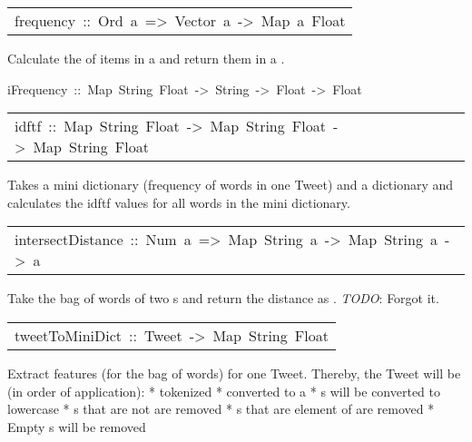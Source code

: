 \begin{haddockdesc}
\item[\begin{tabular}{@{}l}
frequency\ ::\ Ord\ a\ =>\ Vector\ a\ ->\ Map\ a\ Float
\end{tabular}]\haddockbegindoc
Calculate the  of items in a  and return them
 in a .\par

\end{haddockdesc}
\begin{haddockdesc}
\item[
iFrequency\ ::\ Map\ String\ Float\ ->\ String\ ->\ Float\ ->\ Float
]
\end{haddockdesc}
\begin{haddockdesc}
\item[\begin{tabular}{@{}l}
idftf\ ::\ Map\ String\ Float\ ->\ Map\ String\ Float\ ->\ Map\ String\ Float
\end{tabular}]\haddockbegindoc
Takes a mini dictionary (frequency of words in one Tweet) and a
 dictionary and calculates the idftf values for all words in the
 mini dictionary.\par

\end{haddockdesc}
\begin{haddockdesc}
\item[\begin{tabular}{@{}l}
intersectDistance\ ::\ Num\ a\ =>\ Map\ String\ a\ ->\ Map\ String\ a\ ->\ a
\end{tabular}]\haddockbegindoc
Take the bag of words of two s and return the distance as
 . \emph{TODO}: Forgot it.\par

\end{haddockdesc}
\begin{haddockdesc}
\item[\begin{tabular}{@{}l}
tweetToMiniDict\ ::\ Tweet\ ->\ Map\ String\ Float
\end{tabular}]\haddockbegindoc
Extract features (for the bag of words) for one Tweet.
 Thereby, the Tweet will be (in order of application):
 * tokenized
 * converted to a 
 * s will be converted to lowercase
 * s that are not  are removed
 * s that are element of  are removed
 * Empty s will be removed\par

\end{haddockdesc}
